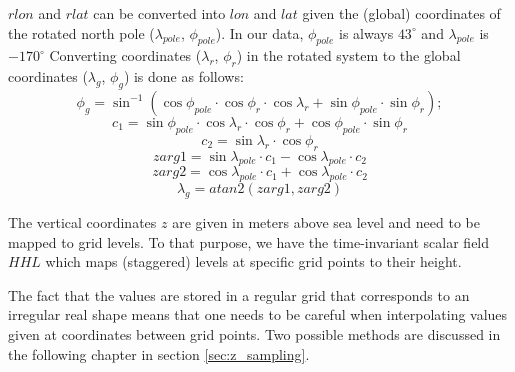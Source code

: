$rlon$ and $rlat$ can be converted into $lon$ and $lat$ given the (global) coordinates of the rotated north pole ($\lambda_{pole}$, $\phi_{pole}$). In our data, $\phi_{pole}$ is always $43^{\circ}$ and $\lambda_{pole}$ is $-170^{\circ}$ Converting coordinates ($\lambda_r$, $\phi_r$) in the rotated system to the global coordinates ($\lambda_g$, $\phi_g$) is done as follows: 
\begin{equation}
		\phi_g = \sin^{-1} ( \cos \phi_{pole} \cdot \cos \phi_r \cdot \cos \lambda_r + \sin \phi_{pole} \cdot \sin \phi_r );
\end{equation}
\begin{equation}
		c_1 = \sin \phi_{pole} \cdot \cos \lambda_r \cdot \cos \phi_r + \cos \phi_{pole} \cdot \sin \phi_r
\end{equation}
\begin{equation}
		c_2 = \sin \lambda_r \cdot \cos \phi_r
\end{equation}
\begin{equation}
		zarg1 = \sin \lambda_{pole} \cdot c_1 - \cos \lambda_{pole} \cdot c_2
\end{equation}
\begin{equation}
		zarg2 = \cos \lambda_{pole} \cdot c_1 + \cos \lambda_{pole} \cdot c_2
\end{equation}
\begin{equation}
		\lambda_g = atan2(zarg1,zarg2)
\end{equation}

The vertical coordinates $z$ are given in meters above sea level and need to be mapped to grid levels. To that purpose, we have the time-invariant scalar field $HHL$ which maps (staggered) levels at specific grid points to their height.

The fact that the values are stored in a regular grid that corresponds to an irregular real shape means that one needs to be careful when interpolating values given at coordinates between grid points. Two possible methods are discussed in the following chapter in section \ref{sec:z_sampling}.



